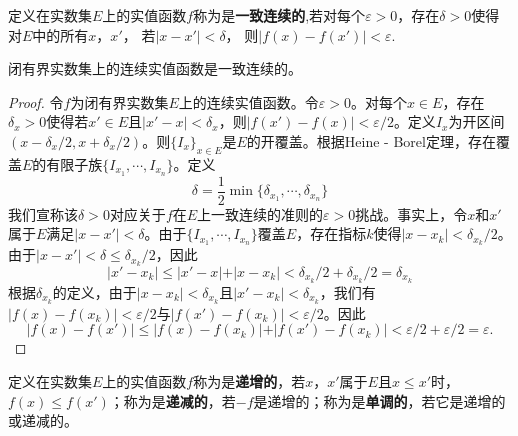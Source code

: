 \documentclass[lang=cn,newtx,10pt,scheme=chinese]{elegantbook}
\begin{document}
\begin{definition}[一致连续]\label{definition:一致连续}
  定义在实数集\(E\)上的实值函数\(f\)称为是\textbf{一致连续的},若对每个\(\varepsilon>0\)，存在\(\delta>0\)使得对\(E\)中的所有\(x\)，\(x'\)，
若\(\vert x - x'\vert<\delta\)， 则\(\vert f(x) - f(x')\vert<\varepsilon.\)
\end{definition}

\begin{theorem}\label{theorem:闭有界实数集上的连续实值函数是一致连续的。}
  闭有界实数集上的连续实值函数是一致连续的。
\end{theorem}
\begin{proof}
  令\(f\)为闭有界实数集\(E\)上的连续实值函数。令\(\varepsilon>0\)。对每个\(x\in E\)，存在\(\delta_x>0\)使得若\(x'\in E\)且\(\vert x' - x\vert<\delta_x\)，则\(\vert f(x') - f(x)\vert<\varepsilon/2\)。定义\(I_x\)为开区间\((x - \delta_x/2, x+\delta_x/2)\)。则\(\{I_x\}_{x\in E}\)是\(E\)的开覆盖。根据Heine - Borel定理，存在覆盖\(E\)的有限子族\(\{I_{x_1}, \cdots, I_{x_n}\}\)。定义
\[
\delta=\frac{1}{2}\min\{\delta_{x_1},\cdots,\delta_{x_n}\}
\]
我们宣称该\(\delta>0\)对应关于\(f\)在\(E\)上一致连续的准则的\(\varepsilon>0\)挑战。事实上，令\(x\)和\(x'\)属于\(E\)满足\(\vert x - x'\vert<\delta\)。由于\(\{I_{x_1}, \cdots, I_{x_n}\}\)覆盖\(E\)，存在指标\(k\)使得\(\vert x - x_k\vert<\delta_{x_k}/2\)。由于\(\vert x - x'\vert<\delta\leqslant\delta_{x_k}/2\)，因此
\[
\vert x' - x_k\vert\leqslant\vert x' - x\vert+\vert x - x_k\vert<\delta_{x_k}/2+\delta_{x_k}/2=\delta_{x_k}
\]
根据\(\delta_{x_k}\)的定义，由于\(\vert x - x_k\vert<\delta_{x_k}\)且\(\vert x' - x_k\vert<\delta_{x_k}\)，我们有\(\vert f(x) - f(x_k)\vert<\varepsilon/2\)与\(\vert f(x') - f(x_k)\vert<\varepsilon/2\)。因此
\[
\vert f(x) - f(x')\vert\leqslant\vert f(x) - f(x_k)\vert+\vert f(x') - f(x_k)\vert<\varepsilon/2+\varepsilon/2=\varepsilon.
\]
\end{proof}

\begin{definition}[实值函数的单调性]\label{definition:实值函数的单调性}
  定义在实数集\(E\)上的实值函数\(f\)称为是\textbf{递增的}，若\(x\)，\(x'\)属于\(E\)且\(x\leqslant x'\)时，\(f(x)\leqslant f(x')\)；称为是\textbf{递减的}，若\(-f\)是递增的；称为是\textbf{单调的}，若它是递增的或递减的。
\end{definition}
\end{document}
